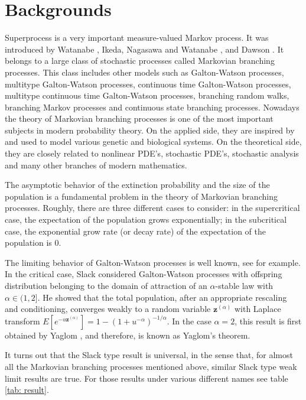 \documentclass[UTF8]{pkuthss}
\theoremstyle{plain}
\theoremstyle{definition}
\numberwithin{equation}{section}
\begin{document}
\section{Backgrounds}
    Superprocess is a very important measure-valued Markov process. 
    It was introduced by Watanabe \cite{Watanabe1968A-limit}, Ikeda, Nagasawa and Watanabe \cite{IkedaNagasawaWatanabe1968Branching1,IkedaNagasawaWatanabe1968Branching2,IkedaNagasawaWatanabe1968Branching3}, and Dawson \cite{Dawson1975Stochastic,Dawson1977The-critical}. 
    It belongs to a large class of stochastic processes called Markovian branching processes. 
    This class includes other models such as Galton-Watson processes, multitype Galton-Watson processes, continuous time Galton-Watson processes, multitype continuous time Galton-Watson processes, branching random walks, branching Markov processes and continuous state branching processes.
    Nowadays the theory of Markovian branching processes is one of the most important subjects in modern probability theory.
    On the applied side, they are inspired by and used to model various genetic and biological systems. 
    On the theoretical side, they are closely related to nonlinear PDE's, stochastic PDE's, stochastic analysis and many other branches of modern mathematics.

    The asymptotic behavior of the extinction probability and the size of the population is a fundamental problem in the theory of Markovian branching processes. 
    Roughly, there are three different cases to consider: in the supercritical case, the expectation of the population grows exponentially; in the subcritical case, the exponential grow rate (or decay rate) of the expectation of the population is $0$.

    The limiting behavior of Galton-Watson processes is well known, see \cite{AthreyaNey1972Branching} for example. 
    In the critical case, Slack \cite{Slack1968A-branching} considered Galton-Watson processes with offspring distribution belonging to the domain of attraction of an $\alpha$-stable law with $\alpha \in (1,2]$. 
    He showed that the total population, after an appropriate rescaling and conditioning, converges weakly to a random variable $\mathbf z^{(\alpha)}$ with Laplace transform $E[e^{-u\mathbf z^{(\alpha)}}] = 1-(1+u^{-\alpha})^{-1/\alpha}$. 
    In the case $\alpha = 2$, this result is first obtained by Yaglom \cite{Yaglom1947Certain}, and therefore, is known as Yaglom's theorem.
    
    It turns out that the Slack type result is universal, in the sense that, for almost all the Markovian branching processes mentioned above, similar Slack type weak limit results are true. 
    For those results under various different names see table \ref{tab: result}.
\end{document}
